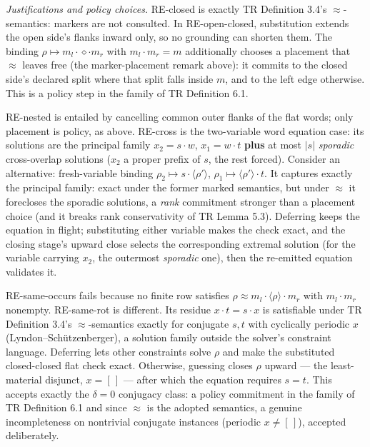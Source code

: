 \documentclass[
  10pt,
  letterpaper,
]{article}
\begin{document}
\emph{Justifications and policy choices.} RE-closed is exactly TR
Definition 3.4's \(\approx\)-semantics: markers are not consulted. In
RE-open-closed, substitution extends the open side's flanks inward only,
so no grounding can shorten them. The binding
\(\rho \mapsto m_l \cdot \diamond \cdot m_r\) with \(m_l \cdot m_r = m\)
additionally chooses a placement that \(\approx\) leaves free (the
marker-placement remark above): it commits to the closed side's declared
split where that split falls inside \(m\), and to the left edge
otherwise. This is a policy step in the family of TR Definition 6.1.

RE-nested is entailed by cancelling common outer flanks of the flat
words; only placement is policy, as above. RE-cross is the two-variable
word equation case: its solutions are the principal family
\(x_2 = s\cdot w\), \(x_1 = w\cdot t\) \textbf{plus} at most \(|s|\)
\emph{sporadic} cross-overlap solutions (\(x_2\) a proper prefix of
\(s\), the rest forced). Consider an alternative: fresh-variable binding
\(\rho_2 \mapsto s\cdot\langle\rho'\rangle\),
\(\rho_1 \mapsto \langle\rho'\rangle\cdot t\). It captures exactly the
principal family: exact under the former marked semantics, but under
\(\approx\) it forecloses the sporadic solutions, a \emph{rank}
commitment stronger than a placement choice (and it breaks rank
conservativity of TR Lemma 5.3). Deferring keeps the equation in flight;
substituting either variable makes the check exact, and the closing
stage's upward close selects the corresponding extremal solution (for
the variable carrying \(x_2\), the outermost \emph{sporadic} one), then
the re-emitted equation validates it.

RE-same-occurs fails because no finite row satisfies
\(\rho \approx m_l \cdot \langle\rho\rangle \cdot m_r\) with
\(m_l \cdot m_r\) nonempty. RE-same-rot is different. Its residue
\(x \cdot t = s \cdot x\) is satisfiable under TR Definition 3.4's
\(\approx\)-semantics exactly for conjugate \(s, t\) with cyclically
periodic \(x\) (Lyndon--Schützenberger), a solution family outside the
solver's constraint language. Deferring lets other constraints solve
\(\rho\) and make the substituted closed-closed flat check exact.
Otherwise, guessing closes \(\rho\) upward --- the least-material
disjunct, \(x = [\,]\) --- after which the equation requires \(s = t\).
This accepts exactly the \(\delta = 0\) conjugacy class: a policy
commitment in the family of TR Definition 6.1 and since \(\approx\) is
the adopted semantics, a genuine incompleteness on nontrivial conjugate
instances (periodic \(x \ne [\,]\)), accepted deliberately.
\end{document}
